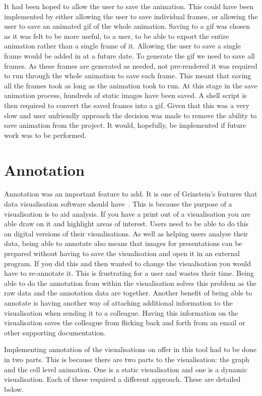It had been hoped to allow the user to save the animation.  This could have been implemented by either allowing the user to save individual frames, or allowing the user to save an animated gif of the whole animation.  Saving to a gif was chosen as it was felt to be more useful, to a user, to be able to export the entire animation rather than a single frame of it.  Allowing the user to save a single frame would be added in at a future date.  To generate the gif we need to save all frames.  As these frames are generated as needed, not pre-rendered it was required to run through the whole animation to save each frame.  This meant that saving all the frames took as long as the animation took to run.  At this stage in the save animation process, hundreds of static images have been saved.  A shell script is then required to convert the saved frames into a gif.  Given that this was a very slow and user unfriendly approach the decision was made to remove the ability to save animation from the project.  It would, hopefully, be implemented if future work was to be performed.

\section{Annotation}

Annotation was an important feature to add.  It is one of Grinstein's features that data visualisation software should have~\cite{gg_vizbi}.  This is because the purpose of a visualisation is to aid analysis.  If you have a print out of a visualisation you are able draw on it and highlight areas of interest.  Users need to be able to do this on digital versions of their visualisations.  As well as helping users analyse their data, being able to annotate also means that images for presentations can be prepared without having to save the visualisation and open it in an external program.  If you did this and then wanted to change the visualisation you would have to re-annotate it.  This is frustrating for a user and wastes their time.  Being able to do the annotation from within the visualisation solves this problem as the raw data and the annotation data are together.  Another benefit of being able to annotate is having another way of attaching additional information to the visualisation when sending it to a colleague. Having this information on the visualisation saves the colleague from flicking back and forth from an email or other supporting documentation.

Implementing annotation of the visualisations on offer in this tool had to be done in two parts.  This is because there are two parts to the visualisation:  the graph and the cell level animation.  One is a static visualisation and one is a dynamic visualisation.  Each of these required a different approach.  These are detailed below.

